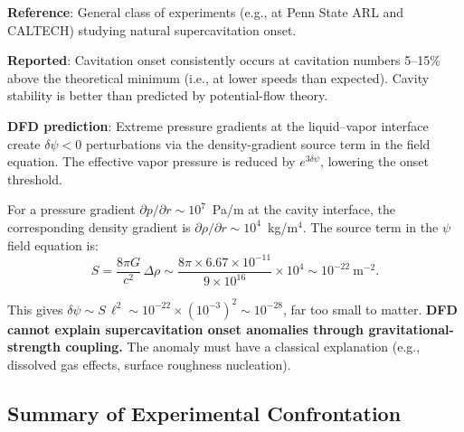 \documentclass[12pt,twocolumn]{article}
\newcommand{\dpsi}{\delta\psi}
\begin{document}
\textbf{Reference}: General class of experiments (e.g., at Penn State ARL
and CALTECH) studying natural supercavitation onset.

\textbf{Reported}: Cavitation onset consistently occurs at cavitation
numbers 5--15\% above the theoretical minimum (i.e., at lower speeds than
expected). Cavity stability is better than predicted by potential-flow
theory.

\textbf{DFD prediction}: Extreme pressure gradients at the
liquid--vapor interface create $\dpsi < 0$ perturbations via the
density-gradient source term in the field equation. The effective vapor
pressure is reduced by $e^{3\dpsi}$, lowering the onset threshold.

For a pressure gradient $\partial p/\partial r \sim 10^7$~Pa/m at
the cavity interface, the corresponding density gradient is
$\partial\rho/\partial r \sim 10^4$~kg/m$^4$. The source term in
the $\psi$ field equation is:
\begin{equation}
S = \frac{8\pi G}{c^2}\,\Delta\rho \sim \frac{8\pi\times6.67\times10^{-11}}
{9\times10^{16}}\times10^4 \sim 10^{-22}~\mathrm{m}^{-2}.
\end{equation}

This gives $\dpsi \sim S\,\ell^2 \sim 10^{-22}\times(10^{-3})^2 \sim
10^{-28}$, far too small to matter. \textbf{DFD cannot explain
supercavitation onset anomalies through gravitational-strength coupling.}
The anomaly must have a classical explanation (e.g., dissolved gas
effects, surface roughness nucleation).

\subsection{Summary of Experimental Confrontation}
\end{document}
